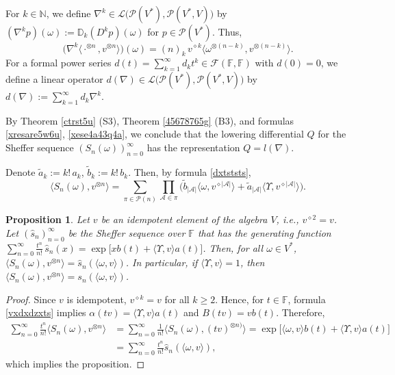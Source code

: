\documentclass[12pt]{article}
\newtheorem{proposition}[theorem]{Proposition}
\theoremstyle{remark}
\theoremstyle{remark}
\theoremstyle{remark}
\begin{document}
For $k\in\mathbb N$, we define $\nabla^{k}\in\mathcal L\big(\mathcal P(V^*),\mathcal P(V^*,V)\big)$ by $(\nabla^{k}p)(\omega):=\mathbb D_k(D^{k}p)(\omega)$ for $p\in\mathcal P(V^*)$. Thus, 
\begin{equation}\label{xese4a43q4a}
\big(\nabla^{k}\langle \cdot^{\otimes n}, v^{\otimes n}\rangle\big)(\omega)=(n)_k\,v^{\diamond k}\langle \omega^{\otimes(n-k)},v^{\otimes(n-k)}\rangle.
\end{equation}
For a formal power series $d(t)=\sum_{k=1}^\infty d_kt^k\in\mathcal F(\mathbb F,\mathbb F)$ with $d(0)=0$, we define a linear operator $d(\nabla)\in\mathcal L\big(\mathcal P(V^*),\mathcal P(V^*,V)\big)$ by $d(\nabla):=\sum_{k=1}^\infty d_k\nabla^k$.

By Theorem \ref{ctrst5u} (S3), Theorem \ref{45678765g} (B3), and formulas \eqref{xresare5w6u}, \eqref{xese4a43q4a}, we conclude that the lowering differential  $Q$ for the Sheffer sequence $(S_n(\omega))_{n=0}^\infty$ has  the representation $Q=l(\nabla)$.

Denote $\tilde a_k:=k!\,a_k$, $\tilde b_k:=k!\,b_k$. Then, by formula \eqref{dxtststs},  
$$\langle S_n(\omega),v^{\otimes n}\rangle=\sum_{\pi\in\mathcal P(n)}\prod_{\mathcal A\in\pi}\big(\tilde b_{|\mathcal A|}\langle\omega,  v^{\diamond|\mathcal A|}\rangle+\tilde a_{|\mathcal A|}\langle \Upsilon,v^{\diamond|\mathcal A|}\rangle\big).$$



\begin{proposition}\label{dfgh37892g2} Let $v$ be an idempotent element of the algebra $V$, i.e., $v^{\diamond2}=v$. Let $(\hat s_n)_{n=0}^\infty$ be the Sheffer sequence over $\mathbb F$ that has the generating function
$\sum_{n=0}^\infty \frac{t^n}{n!}\,\hat s_n(x)=\exp\big[xb(t)+\langle \Upsilon, v\rangle a(t)\big]$.
Then, for all $\omega\in V^*$, $\langle S_n(\omega),v^{\otimes n}\rangle=\hat s_n(\langle \omega,v\rangle)$. 
In particular, if $\langle \Upsilon,v\rangle=1$, then 
$\langle S_n(\omega),v^{\otimes n}\rangle=s_n(\langle\omega,v\rangle)$.
\end{proposition}

\begin{proof} Since $v$ is idempotent, $v^{\diamond k}=v$ for all $k\geq2$. Hence, for $t\in\mathbb F$, formula \eqref{vxdxdzxts} implies $\alpha(tv)=\langle \Upsilon,v\rangle a(t)$ and $B(tv)=vb(t)$. Therefore,
\begin{align*}\sum_{n=0}^\infty\frac{t^n}{n!}\langle S_n(\omega),v^{\otimes n}\rangle
&=\sum_{n=0}^\infty\frac1{n!}\langle S_n(\omega),(tv)^{\otimes n)}\rangle=\exp\big[\langle\omega,v\rangle b(t)+\langle \Upsilon,v\rangle a(t)\big]\\
&=\sum_{n=0}^\infty\frac{t^n}{n!} \hat s_n(\langle\omega,v\rangle),\end{align*}
which implies the proposition. 
\end{proof}
\end{document}
